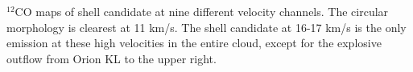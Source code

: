 \label{fig:channelmaps} $^{12}$CO maps of shell candidate at nine different velocity channels. The circular morphology is clearest at 11 km/s. The shell candidate at 16-17 km/s is the only emission at these high velocities in the entire cloud, except for the explosive outflow from Orion KL to the upper right.